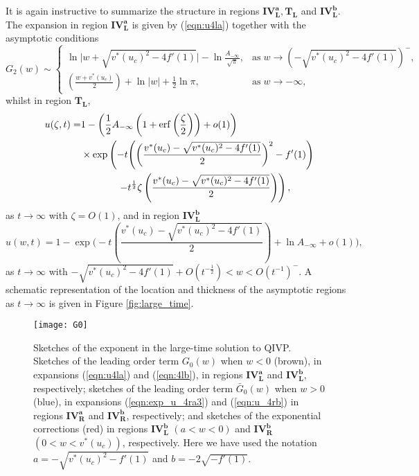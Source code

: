 \documentclass[11pt,a4paper]{article}
\newcommand{\eeref}[1]{(\ref{eqn:#1})}
\newcommand{\eelab}[1]{\label{eqn:#1}}
\newcommand{\ffref}[1]{\ref{fig:#1}}
\newcommand{\fflab}[1]{\label{fig:#1}}
\def\beq{\begin{equation}}
\def\eeq{\end{equation}}
\DeclareMathOperator\erf{erf}
\begin{document}
It is again instructive to summarize the structure in regions $\mathbf{IV_L^a}, \mathbf{T_L}$ and $\mathbf{IV_L^b}$. The expansion in region $\mathbf{IV_L^a}$ is given by \eeref{u4la} together with the asymptotic conditions
\begin{equation}  \eelab{match_con_4la_full}
G_2(w) \sim  \begin{cases}  
\ln \lvert w + \sqrt{v^*(u_c)^2 - 4f'(1)} \rvert - \ln \frac{A_{-\infty}}{\sqrt{\pi}}, &  \mbox{as} \; w \to \left( -\sqrt{v^*(u_c)^2 - 4f'(1)} \right)^-,\\
 \left( \frac{w + v^*(u_c) }{2} \right) + \ln \lvert w \rvert + \frac{1}{2} \ln \pi, & \mbox{as} \; w \to -\infty, \end{cases}  
\end{equation}
%
whilst in region $\mathbf{T_L}$,
%
  \begin{align} \eelab{exp_uTL}
u(\zeta,t) = & 1- \left( \frac{1}{2} A_{-\infty} \left(1 + \erf \left( \frac{\zeta}{2} \right) \right)+ o(1) \right)  \nonumber  \\ 
&  \times \exp \left( -t  \Bigg( \bigg( \frac{ v^*(u_c) - \sqrt{v^*(u_c)^2 - 4f'(1)}}{2} \bigg)^2 -f'(1) \Bigg)  \right. \nonumber \\
&  \left. \hspace{1.32cm} - t^{\frac{1}{2}} \zeta \left( \frac{v^*(u_c) - \sqrt{v^*(u_c)^2 - 4f'(1)}}{2} \right)  \right) ,
\end{align} 
as $t \to \infty$ with $\zeta = O(1)$, and in region $\mathbf{IV_L^b}$
\beq
u(w,t) =  1 - \exp \Bigg( -t \left( \frac{v^*(u_c) - \sqrt{v^*(u_c)^2 - 4f'(1)}}{2} \right)  + \ln A_{-\infty} + o(1) \Bigg) , \eelab{4lb}
\eeq
as $t \to \infty$ with $-  \sqrt{v^*(u_c)^2 -  4 f'(1)} + O(t^{-\frac{1}{2}}) < w < O(t^{-1})^-$. 
A schematic representation of the location and thickness of the asymptotic regions as $t \to \infty$ is given in Figure \ffref{large_time}.
%
\begin{figure}
\centering
{\texttt{[image: G0]}} %
\caption{Sketches of the exponent in the large-time solution to QIVP. Sketches of the leading order term $G_0(w)$ when $w < 0$  (brown), in expansions \eeref{u4la} and \eeref{4lb}, in regions $\mathbf{IV_L^a}$ and $\mathbf{IV_L^b}$, respectively; sketches of the leading order term $\bar{G}_0(w)$ when $w > 0$ (blue), in expansions \eeref{exp_u_4ra3} and \eeref{u_4rb} in regions $\mathbf{IV_R^a}$ and $\mathbf{IV_R^b}$, respectively; and sketches of the exponential corrections (red) in regions $\mathbf{IV_L^b}$ $(a < w < 0)$ and $\mathbf{IV_R^b}$ $( 0 < w < v^*(u_c))$, respectively. Here we have used the notation $a= - \sqrt{ v^*(u_c)^2 - f'(1)}$ and $b= - 2 \sqrt{- f'(1)}$.}
\fflab{region4}
\end{figure}
\end{document}
